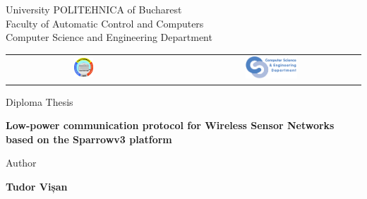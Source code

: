 


\pagestyle{empty}
\sffamily

\noindent
\begin{center}
	\Large
	University POLITEHNICA of Bucharest\\
	Faculty of Automatic Control and Computers \\
	Computer Science and Engineering Department \\
	\begin{table}[h]
		\begin{center}
			\begin{tabular}{cccc}
				\includegraphics[width=0.13\textwidth]
				{img/upb.png}
				& & &
				\includegraphics[width=0.30\textwidth]
				{img/cs.png}
			\end{tabular}
		\end{center}
	\end{table}
\end{center}

\vfill\vfill
\begin{center}
	\Large
	Diploma Thesis\\
\end{center}

\vfill
\begin{center}
	\HUGE\bfseries
	Low-power communication protocol for Wireless Sensor Networks based on
	the Sparrowv3 platform\\
	\vfill
	\large
\end{center}

\vfill
\begin{center}
	\Large
	Author
\end{center}

\begin{center}
	\huge\bfseries
	Tudor Vișan
\end{center}

